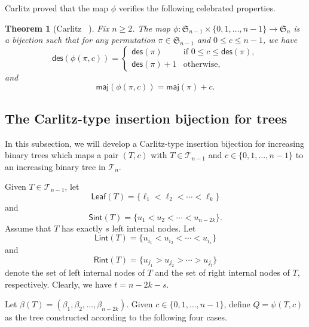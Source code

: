 \documentclass[12pt]{article}
\numberwithin{equation}{section}
\theoremstyle{plain}
\newtheorem{theorem}{Theorem}[section]
\def\des{\mathsf{des}}
\def\maj{\mathsf{maj}}
\def\Lint{\mathsf{Lint}}
\def\Leaf{\mathsf{Leaf}}
\def\Rint{\mathsf{Rint}}
\def\Sint{\mathsf{Sint}}
\def\B{\mathcal{T}}
\begin{document}
	 	
	 	Carlitz \cite{Carlitz}  proved that the map $\phi$  verifies  the following celebrated  properties.
	 		\begin{theorem}[Carlitz~ \cite{Carlitz}] \label{thm-Car}
	 	Fix $n\geq 2$. 	The map $\phi\colon \mathfrak{S}_{n-1}\times \{0,1,\dots,n-1\}\rightarrow  \mathfrak{S}_{n}$ is a bijection such that
	 		for  any permutation $\pi\in \mathfrak{S}_{n-1}$ and $0\le c\le n-1$, we have
	 		\begin{equation}\label{eq-phi-1}
	 		\des(\phi(\pi, c))=\left\{ 
	 		 \begin{array}{ll}
	 			\des(\pi) & \text{if } 0\le c\le \des(\pi),\\[2pt]
	 			\des(\pi)+1 & \text{otherwise},
	 	\end{array}
	 	\right.
	 		\end{equation}
	 		and
	 		\begin{equation}\label{eq-phi-2}
	 		\maj(\phi(\pi, c))=\maj(\pi)+c.
	 		\end{equation}
	 	\end{theorem}
	 	
	 	
	 
	 	
	 	
	 	
	 \subsection{The Carlitz-type insertion bijection for trees }
	 In this subsection, we will develop a Carlitz-type insertion bijection for  increasing binary trees which maps a  pair $(T,c)$ with $T\in \B_{n-1}$ and $c\in \{0,1,\ldots, n-1\}$ to an increasing binary tree in $\B_n$.
	 
	 
	 	
	 	
	 	
	 \noindent{\bf The map $\psi: \B_{n-1}\times \{0,1, \ldots, n-1\}\rightarrow \B_n$.}
	 
	 	Given $T\in \B_{n-1}$, let 
	 	$$
	 	\Leaf(T)=\{\ell_1<\ell_2<\cdots<\ell_k\}
	 	$$
	  and
	 	$$\Sint(T)=\{u_1<u_2<\cdots< u_{n-2k}\}.$$  Assume that $T$ has exactly $s$ left  internal nodes. Let 
	 	$$
	 	\Lint(T)=\{u_{i_1}<u_{i_2}<\cdots<u_{i_s}\} 
	 	$$
	 	and 
	 	$$
	 	\Rint(T)=\{u_{j_1}>u_{j_2}>\cdots>u_{j_t}\}
	 	$$
	 	denote the set of  left  internal nodes  of $T$ and the set of right   internal nodes of $T$, respectively.   Clearly, we have $t=n-2k-s$. 
	 	
	 	
	 	 Let $\beta(T)=(\beta_1, \beta_2, \ldots, \beta_{n-2k})$.
	 Given $c\in \{0,1,\dots,n-1\}$, define $Q=\psi(T,c)$ as the tree constructed according to the following four cases.
	 
\end{document}
